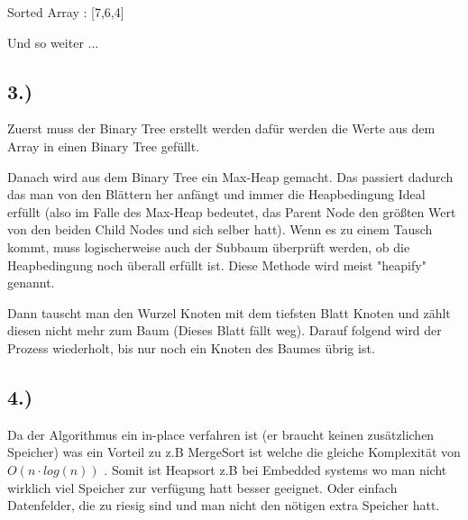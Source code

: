 \documentclass{article}
\begin{document}

Sorted Array : [7,6,4]

Und so weiter ...

\subsection*{3.)}

Zuerst muss der Binary Tree erstellt werden dafür werden die Werte aus dem Array in einen Binary Tree gefüllt.

Danach wird aus dem Binary Tree ein Max-Heap gemacht. Das passiert dadurch das man von den Blättern her anfängt und immer die Heapbedingung Ideal erfüllt (also im Falle des Max-Heap bedeutet, das Parent Node den größten Wert von den beiden Child Nodes und sich selber hatt). Wenn es zu einem Tausch kommt, muss logischerweise auch der Subbaum überprüft werden, ob die Heapbedingung noch überall erfüllt ist. Diese Methode wird meist "heapify" genannt.

Dann tauscht man den Wurzel Knoten mit dem tiefsten Blatt Knoten und zählt diesen nicht mehr zum Baum (Dieses Blatt fällt weg). Darauf folgend wird der Prozess wiederholt, bis nur noch ein Knoten des Baumes übrig ist.


\subsection*{4.)}

Da der Algorithmus ein in-place verfahren ist (er braucht keinen zusätzlichen Speicher) was ein Vorteil zu z.B MergeSort ist welche die gleiche Komplexität von \( O( n \cdot log(n) ) \) . Somit ist Heapsort z.B bei Embedded systems wo man nicht wirklich viel Speicher zur verfügung hatt besser geeignet. Oder einfach Datenfelder, die zu riesig sind und man nicht den nötigen extra Speicher hatt.
\end{document}
